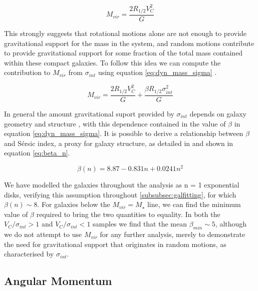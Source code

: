 \documentclass[fleqn,usenatbib]{mn2e}
\newcommand{\Sers}{S\'{e}rsic }
\begin{document}
\begin{equation}\label{eq:dyn_mass_v_only}
   M_{vir} = \frac{2R_{1/2}V_{C}^{2}}{G}
\end{equation}

This strongly suggests that rotational motions alone are not enough to provide gravitational support for the mass in the system, and random motions contribute to provide gravitational support for some fraction of the total mass contained within these compact galaxies.
To follow this idea we can compute the contribution to $M_{vir}$ from $\sigma_{int}$ using equation \ref{eq:dyn_mass_sigma} \citep[e.g.][]{Cappellari2006}.

\begin{equation}\label{eq:dyn_mass_sigma}
   M_{vir} = \frac{2R_{1/2}V_{C}^{2}}{G} + \frac{\beta R_{1/2}\sigma_{int}^{2}}{G}
\end{equation}     

In general the amount gravitational suport provided by $\sigma_{int}$ depends on galaxy geometry and structure \citep[e.g.][]{Cappellari2006,Belli2014}, with this dependence contained in the value of $\beta$ in equation \ref{eq:dyn_mass_sigma}.
It is possible to derive a relationship between $\beta$ and \Sers index, a proxy for galaxy structure, as detailed in \cite{Cappellari2006} and shown in equation \ref{eq:beta_n}.

\begin{equation}\label{eq:beta_n}
   \beta(n) = 8.87 - 0.831n + 0.0241n^{2}
\end{equation} 


We have modelled the galaxies throughout the analysis as n = 1 exponential disks, verifying this assumption throughout \cref{subsubsec:galfitting}, for which $\beta(n) \sim 8$.
For galaxies below the $M_{vir} = M_{\star}$ line, we can find the minimum value of $\beta$ required to bring the two quantities to equality.
In both the $V_{C}/\sigma_{int} > 1$ and $V_{C}/\sigma_{int} < 1$ samples we find that the mean $\beta_{min}\sim 5$, although we do not attempt to use $M_{vir}$ for any further analysis, merely to demonstrate the need for gravitational support that originates in random motions, as characterised by $\sigma_{int}$.

\subsection{Angular Momentum}\label{subsec:ang_mom}
\end{document}
